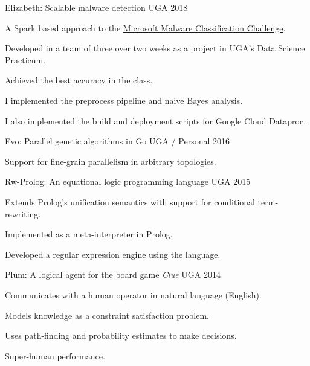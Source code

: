 \begin{cventries}

\cventry
{\textnormal{}}
{Elizabeth: Scalable malware detection}
{UGA}
{2018}
{\begin{cvitems}
    \item {A Spark based approach to the \href{https://www.kaggle.com/c/malware-classification/}{Microsoft Malware Classification Challenge}.}
    \item {Developed in a team of three over two weeks as a project in UGA's Data Science Practicum.}
    \item {Achieved the best accuracy in the class.}
    \item {I implemented the preprocess pipeline and naive Bayes analysis.}
    \item {I also implemented the build and deployment scripts for Google Cloud Dataproc.}
\end{cvitems}}

\cventry
{\textnormal{}}
{Evo: Parallel genetic algorithms in Go}
{UGA / Personal}
{2016}
{\begin{cvitems}
    \item {Support for fine-grain parallelism in arbitrary topologies.}
\end{cvitems}}

\cventry
{\textnormal{}}
{Rw-Prolog: An equational logic programming language}
{UGA}
{2015}
{\begin{cvitems}
    \item {Extends Prolog's unification semantics with support for conditional term-rewriting.}
    \item {Implemented as a meta-interpreter in Prolog.}
    \item {Developed a regular expression engine using the language.}
\end{cvitems}}

\cventry
{\textnormal{}}
{Plum: A logical agent for the board game \textit{Clue}}
{UGA}
{2014}
{\begin{cvitems}
    \item {Communicates with a human operator in natural language (English).}
    \item {Models knowledge as a constraint satisfaction problem.}
    \item {Uses path-finding and probability estimates to make decisions.}
    \item {Super-human performance.}
\end{cvitems}}

\end{cventries}
